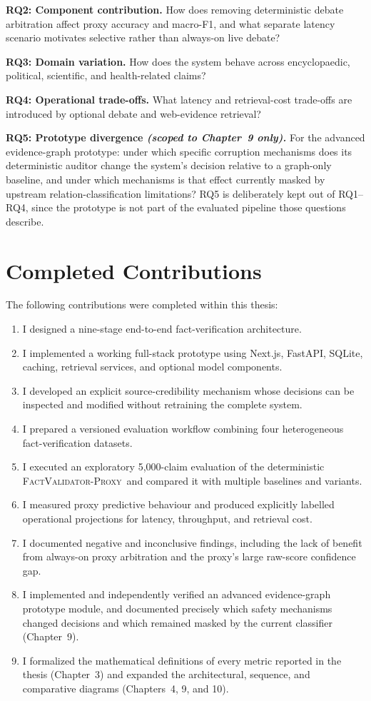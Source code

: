 \documentclass[12pt,a4paper,openany]{report}
\newcommand{\proxy}{\textsc{FactValidator-Proxy}}
\begin{document}
\textbf{RQ2: Component contribution.} How does removing deterministic debate arbitration affect proxy accuracy and macro-F1, and what separate latency scenario motivates selective rather than always-on live debate?

\textbf{RQ3: Domain variation.} How does the system behave across encyclopaedic, political, scientific, and health-related claims?

\textbf{RQ4: Operational trade-offs.} What latency and retrieval-cost trade-offs are introduced by optional debate and web-evidence retrieval?

\textbf{RQ5: Prototype divergence \emph{(scoped to Chapter~9 only).}} For the advanced evidence-graph prototype: under which specific corruption mechanisms does its deterministic auditor change the system's decision relative to a graph-only baseline, and under which mechanisms is that effect currently masked by upstream relation-classification limitations? RQ5 is deliberately kept out of RQ1--RQ4, since the prototype is not part of the evaluated pipeline those questions describe.

\section{Completed Contributions}
The following contributions were completed within this thesis:
\begin{enumerate}
  \item I designed a nine-stage end-to-end fact-verification architecture.
  \item I implemented a working full-stack prototype using Next.js, FastAPI, SQLite, caching, retrieval services, and optional model components.
  \item I developed an explicit source-credibility mechanism whose decisions can be inspected and modified without retraining the complete system.
  \item I prepared a versioned evaluation workflow combining four heterogeneous fact-verification datasets.
  \item I executed an exploratory 5{,}000-claim evaluation of the deterministic \proxy\ and compared it with multiple baselines and variants.
  \item I measured proxy predictive behaviour and produced explicitly labelled operational projections for latency, throughput, and retrieval cost.
  \item I documented negative and inconclusive findings, including the lack of benefit from always-on proxy arbitration and the proxy's large raw-score confidence gap.
  \item I implemented and independently verified an advanced evidence-graph prototype module, and documented precisely which safety mechanisms changed decisions and which remained masked by the current classifier (Chapter~9).
  \item I formalized the mathematical definitions of every metric reported in the thesis (Chapter~3) and expanded the architectural, sequence, and comparative diagrams (Chapters~4, 9, and 10).
\end{enumerate}
\end{document}
